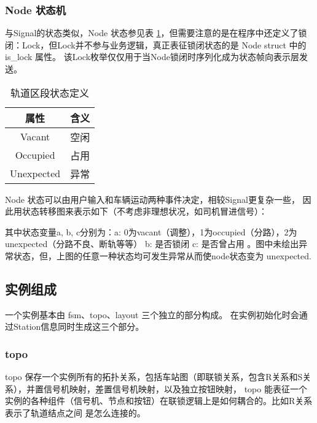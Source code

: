 \subsubsection{Node 状态机}
与Signal的状态类似，Node 状态参见表 \ref{node_state}，但需要注意的是在程序中还定义了锁闭：Lock，但Lock并不参与业务逻辑，真正表征锁闭状态的是 Node struct 中的is\_lock 属性。
该Lock枚举仅仅用于当Node锁闭时序列化成为状态帧向表示层发送。
\begin{table}[htpb!]
    \centering
    \caption{\label{node_state}轨道区段状态定义}
    \begin{threeparttable}
        \begin{tabular}{cc}
            \toprule
            属性       & 含义 \\
            \midrule
            Vacant     & 空闲 \\
            Occupied   & 占用 \\
            Unexpected & 异常 \\
            \bottomrule
        \end{tabular}
    \end{threeparttable}
\end{table}

Node 状态可以由用户输入和车辆运动两种事件决定，相较Signal更复杂一些，
因此用状态转移图来表示如下（不考虑非理想状况，如司机冒进信号）：

\begin{figure}[ht]
    \centering
    
\end{figure}

其中状态变量{a, b, c}分别为：a: 0为vacant（调整），1为occupied（分路），2为unexpected（分路不良、断轨等等） b: 是否锁闭 c: 是否曾占用
。图中未绘出异常状态，但，上图的任意一种状态均可发生异常从而使node状态变为 unexpected.
\subsection{实例组成}
一个实例基本由 fsm、topo、layout 三个独立的部分构成。
在实例初始化时会通过Station信息同时生成这三个部分。
\subsubsection{topo}
topo 保存一个实例所有的拓扑关系，包括车站图（即联锁关系，包含R关系和S关系），并置信号机映射，差置信号机映射，以及独立按钮映射，
topo 能表征一个实例的各种组件（信号机、节点和按钮）在联锁逻辑上是如何耦合的。比如R关系表示了轨道结点之间
是怎么连接的。

